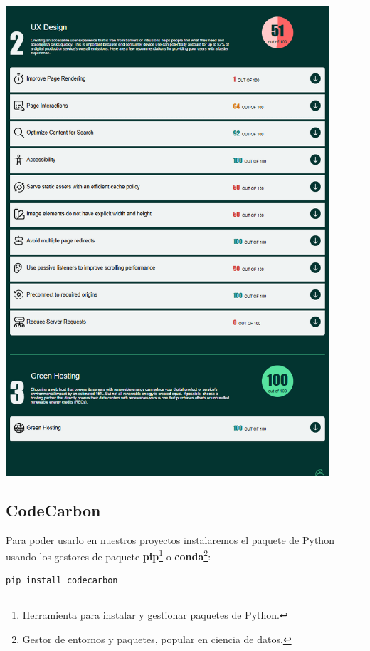 \documentclass[12pt,a4paper]{report}
\begin{document}
\begin{center}
  \includegraphics[width=0.9\textwidth]{imagenes/Ecograder_5.png}
  \label{fig:recomendaciones2}
\end{center}

\subsection{CodeCarbon}
Para poder usarlo en nuestros proyectos instalaremos el paquete de Python
usando los gestores de paquete \textbf{pip}\footnote{Herramienta para instalar
  y gestionar paquetes de Python.} o \textbf{conda}\footnote{Gestor de entornos y
  paquetes, popular en ciencia de datos.}:

\begin{tcolorbox}[colback=codebackground, colframe=codeborder, boxrule=0.8pt, arc=0mm, boxsep=5pt, left=5pt, right=5pt, top=5pt, bottom=5pt]
  \begin{lstlisting}[language=bash]
    pip install codecarbon
  \end{lstlisting}
\end{tcolorbox}
\end{document}
